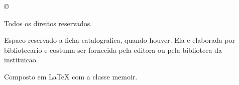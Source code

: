 %

\thispagestyle{empty}
\begin{SingleSpace}
  \vspace*{\fill}
  \noindent
  \copyright{} \lkYear{} \lkAuthor

  \vspace{0.5em}
  \noindent
  Todos os direitos reservados.

  \lkIfPublisher{
    \vspace{1em}
    \noindent
    \lkPublisher
  }{}


  \vspace{1em}
  \noindent
  {\footnotesize
    Espaco reservado a ficha catalografica, quando houver. Ela e
    elaborada por bibliotecario e costuma ser fornecida pela editora ou
    pela biblioteca da instituicao.
  }

  \vspace{2em}
  \noindent
  {\footnotesize Composto em \LaTeX{} com a classe memoir.}
\end{SingleSpace}
\cleardoublepage
